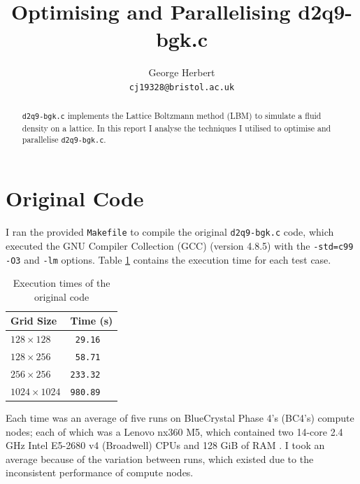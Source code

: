 \documentclass[twocolumn, a4paper]{article}
\author{
  George Herbert\\
  \texttt{cj19328@bristol.ac.uk}
}
\title{\vspace{-2em}Optimising and Parallelising d2q9-bgk.c}
\begin{document}
\maketitle

\begin{abstract}
    \texttt{d2q9-bgk.c} implements the Lattice Boltzmann method (LBM) to simulate a fluid density on a lattice.
    In this report I analyse the techniques I utilised to optimise and parallelise \texttt{d2q9-bgk.c}.
\end{abstract}

\section{Original Code}

I ran the provided \texttt{Makefile} to compile the original \texttt{d2q9-bgk.c} code, which executed the GNU Compiler Collection (GCC) (version 4.8.5) with the \texttt{-std=c99} \texttt{-O3} and \texttt{-lm} options.
Table \ref{tab:original} contains the execution time for each test case.

\begin{table}[htbp]
  \begin{center}
  \caption{Execution times of the original code}\label{tab:original}
  \begin{tabular}[t]{l | l} 
      \hline\hline
      Grid Size&Time (s)\\
      \hline
      $128 \times 128$&\texttt{ 29.16}\\
      $128 \times 256$&\texttt{ 58.71}\\
      $256 \times 256$&\texttt{233.32}\\
      $1024 \times 1024$&\texttt{980.89}\\
      \hline
    \end{tabular}
  \end{center}
\end{table} 

Each time was an average of five runs on BlueCrystal Phase 4's (BC4's) compute nodes; each of which was a Lenovo nx360 M5, which contained two 14-core 2.4 GHz Intel E5-2680 v4 (Broadwell) CPUs and 128 GiB of RAM \cite{bcp4}.
I took an average because of the variation between runs, which existed due to the inconsistent performance of compute nodes.
\end{document}
